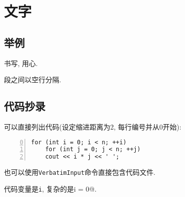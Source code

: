 \chapter{文字}

\section{举例}

  书写, 用心.

  段之间以空行分隔.

\newpage

\section{代码抄录}

可以直接列出代码(设定缩进距离为2, 每行编号并从0开始):
\begin{Verbatim}[tabsize=2,numbers=left,firstnumber=0]
for (int i = 0; i < n; ++i)
	for (int j = 0; j < n; ++j)
    cout << i * j << ' ';
\end{Verbatim}

	也可以使用\texttt{VerbatimInput}命令直接包含代码文件.

	代码变量是\texttt{i}, 复杂的是\Verb@int i = 0@.
